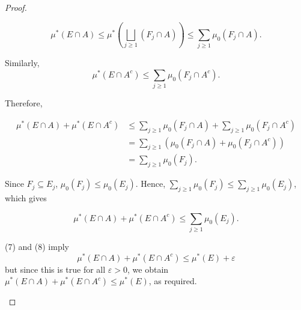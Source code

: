 \begin{proof}
\begin{enumerate}
            \begin{equation*}
                \mu^*(E \cap A) \leq \mu^*\left( \bigsqcup_{j \geq 1} (F_j \cap A) \right) \leq \sum_{j \geq 1} \mu_0(F_j \cap A).
            \end{equation*}

            Similarly, 
             \begin{equation*}
                \mu^*(E \cap A^c) \leq \sum_{j \geq 1} \mu_0(F_j \cap A^c).
            \end{equation*}

            Therefore,
            
            \begin{align*}
                \mu^*(E \cap A) + \mu^*(E \cap A^c) &\leq \sum_{j \geq 1} \mu_0(F_j \cap A) + \sum_{j \geq 1} \mu_0(F_j \cap A^c) \\
                &= \sum_{j \geq 1} (\mu_0(F_j \cap A) + \mu_0(F_j \cap A^c))  \\
                &= \sum_{j \geq 1} \mu_0(F_j).
            \end{align*}

            Since $F_j \subseteq E_j$, $\mu_0(F_j) \leq \mu_0(E_j)$. Hence, $\sum_{j \geq 1} \mu_0(F_j) \leq \sum_{j \geq 1} \mu_0(E_j)$, which gives

            \begin{equation}
                \mu^*(E \cap A) + \mu^*(E \cap A^c) \leq \sum_{j \geq 1} \mu_0(E_j).
            \end{equation}

            (7) and (8) imply
            \begin{equation*}
                \mu^*(E \cap A) + \mu^*(E \cap A^c) \leq \mu^*(E) + \varepsilon
            \end{equation*}
            but since this is true for all $\varepsilon > 0$, we obtain $ \mu^*(E \cap A) + \mu^*(E \cap A^c) \leq \mu^*(E) $, as required. 
        \end{enumerate}
    \end{proof}

